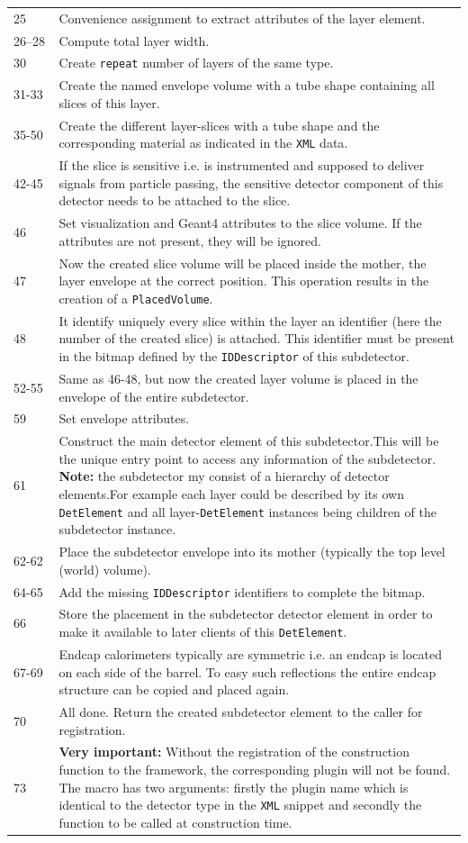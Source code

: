 {\begin{tabular} {p{0.1\linewidth}|p{0.9\linewidth}}
25 & Convenience assignment to extract attributes of the layer element.\\
26--28 & Compute total layer width.\\
30 & Create \texttt{repeat} number of layers of the same type.\\
31-33 & Create the named envelope volume with a tube shape containing all slices of this layer.\\
35-50 & Create the different layer-slices with a tube shape and the corresponding material as indicated in the \texttt{XML} data.\\
42-45 & If the slice is sensitive i.e. is instrumented and supposed to deliver signals from particle passing, the sensitive detector component of this detector needs to be attached to the slice.\\
46 & Set visualization and Geant4 attributes to the slice volume. If the attributes are not present, they will be ignored.\\
47 & Now the created slice volume will be placed inside the mother, the layer envelope at the correct position. This operation results in the creation of a \texttt{PlacedVolume}.\\
48 & It identify uniquely every slice within the layer an identifier (here the number of the created slice) is attached. This identifier must be present in the bitmap defined by the \texttt{IDDescriptor} of this subdetector.\\
52-55 & Same as 46-48, but now the created layer volume is placed in the envelope of the entire subdetector.\\
59 & Set envelope attributes.\\
61 & Construct the main detector element of this subdetector.This will be the unique entry point to access any information of the subdetector. {\textbf{Note:}} the subdetector my consist of a hierarchy of detector elements.For example each layer could be described by its own \texttt{DetElement} and all layer-\texttt{DetElement} instances being children of the subdetector instance.\\
62-62 & Place the subdetector envelope into its mother (typically the top level (world) volume).\\
64-65 & Add the missing \texttt{IDDescriptor} identifiers to complete the bitmap.\\
66 & Store the placement in the subdetector detector element in order to make it available to later clients of this \texttt{DetElement}. \\
67-69 & Endcap calorimeters typically are symmetric i.e. an endcap is located on each side of the barrel. To easy such reflections the entire endcap structure can be copied and placed again. \\
70 & All done. Return the created subdetector element to the caller for registration. \\ 
73 & \textbf{Very important:} Without the registration of the construction function to the framework, the corresponding plugin will not be found. The macro has two arguments: firstly the plugin name which is identical to the detector type in the \texttt{XML} snippet and secondly the function to be called at construction time.
\end{tabular}
}
